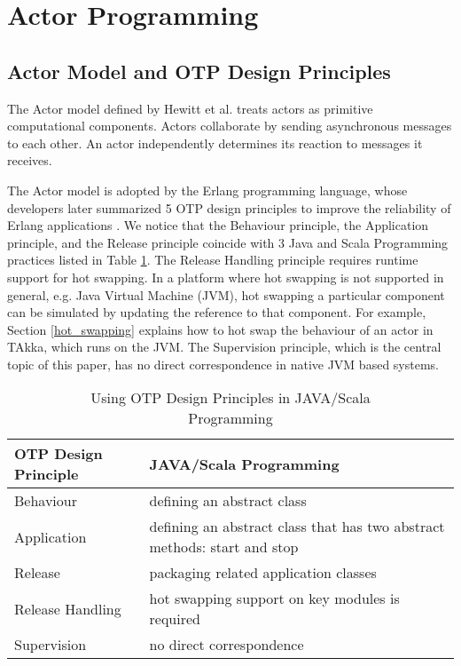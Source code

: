 \section{Actor Programming}
\label{background}

\subsection{Actor Model and OTP Design Principles}

The Actor model defined by Hewitt et al.  \cite{Hewitt:1973} treats actors as
primitive computational components.  Actors collaborate by sending asynchronous
messages to each other.  An actor independently determines its reaction to
messages it receives.

The Actor model is adopted by the Erlang programming language, whose 
developers later summarized 5 OTP design principles to improve the 
reliability of Erlang applications \cite{OTP}.  We notice that the Behaviour 
principle, the Application principle, and the Release principle coincide with 
3 Java and Scala Programming practices listed in Table \ref{otp}.  The 
Release Handling principle requires runtime support for hot swapping.  In a 
platform where hot swapping is not supported in general, e.g. Java Virtual 
Machine (JVM), hot swapping a particular component can be simulated by updating 
the reference to that component. For example, Section \ref{hot_swapping} 
explains how to hot swap the behaviour of an actor in TAkka, which runs on the 
JVM. The Supervision principle, which is the central topic of this paper, 
has no direct correspondence in native JVM based systems.

\begin{table}[t]
\label{otp}
 \begin{center}
\begin{tabular}{| l | p{4.5 cm} | }
\hline
  OTP Design Principle & JAVA/Scala Programming \\
\hline
  Behaviour & defining an abstract class \\
\hline
  Application  & defining an abstract class that has two abstract methods: start and stop \\
\hline
  Release  & packaging related application classes  \\ 
\hline
  Release Handling  & hot swapping support on key modules is required \\
\hline
  Supervision  & no direct correspondence  \\
\hline
\end{tabular}
 \caption[]{Using OTP Design Principles in JAVA/Scala\\  Programming}
\end{center}
\end{table}




